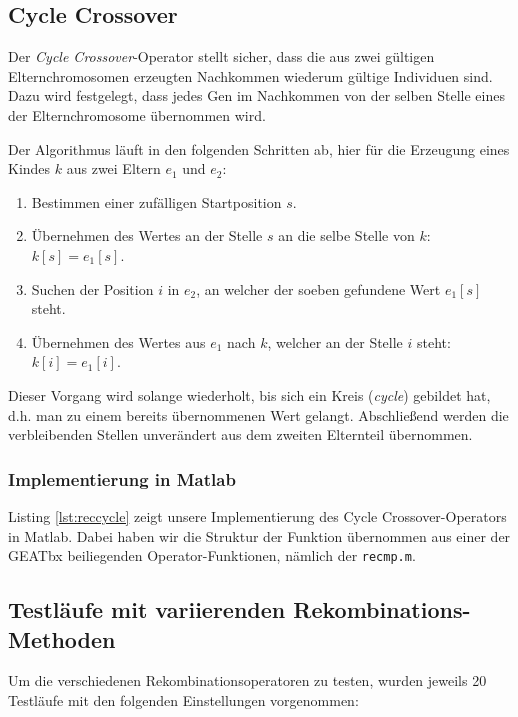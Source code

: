 \subsection{Cycle Crossover}
Der \emph{Cycle Crossover}-Operator stellt sicher, dass die aus zwei gültigen
Elternchromosomen erzeugten Nachkommen wiederum gültige Individuen sind. Dazu
wird festgelegt, dass jedes Gen im Nachkommen von der selben Stelle eines der
Elternchromosome übernommen wird.

Der Algorithmus läuft in den folgenden Schritten ab, hier für die Erzeugung eines
Kindes $k$ aus zwei Eltern $e_1$ und $e_2$:

\begin{enumerate}
  \item Bestimmen einer zufälligen Startposition $s$.
  \item Übernehmen des Wertes an der Stelle $s$ an die selbe Stelle von $k$:
  $k[s] = e_1[s]$.
  \item Suchen der Position $i$ in $e_2$, an welcher der soeben gefundene Wert
  $e_1[s]$ steht.
  \item Übernehmen des Wertes aus $e_1$ nach $k$, welcher an der Stelle $i$
  steht: $k[i] = e_1[i]$.
\end{enumerate}

Dieser Vorgang wird solange wiederholt, bis sich ein Kreis (\emph{cycle})
gebildet hat, d.h. man zu einem bereits übernommenen Wert gelangt. Abschließend werden
die verbleibenden Stellen unverändert aus dem zweiten Elternteil übernommen.

\subsubsection{Implementierung in Matlab}
Listing \ref{lst:reccycle} zeigt unsere Implementierung des Cycle
Crossover-Operators in Matlab. Dabei haben wir die Struktur der Funktion
übernommen aus einer der GEATbx beiliegenden Operator-Funktionen, nämlich der
\texttt{recmp.m}.



\subsection{Testläufe mit variierenden Rekombinations-Methoden}
Um die verschiedenen Rekombinationsoperatoren zu testen, wurden jeweils 20
Testläufe mit den folgenden Einstellungen vorgenommen:

